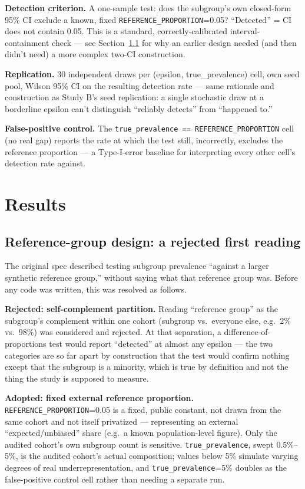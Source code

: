 \documentclass[11pt]{article}
\begin{document}
\textbf{Detection criterion.} A one-sample test: does the subgroup's own closed-form 95\% CI exclude a known, fixed \texttt{REFERENCE\_PROPORTION}=0.05? ``Detected'' = CI does not contain 0.05. This is a standard, correctly-calibrated interval-containment check --- see Section~\ref{sec:reference-design} for why an earlier design needed (and then didn't need) a more complex two-CI construction.

\textbf{Replication.} 30 independent draws per (epsilon, true\_prevalence) cell, own seed pool, Wilson 95\% CI on the resulting detection rate --- same rationale and construction as Study B's seed replication: a single stochastic draw at a borderline epsilon can't distinguish ``reliably detects'' from ``happened to.''

\textbf{False-positive control.} The \texttt{true\_prevalence == REFERENCE\_PROPORTION} cell (no real gap) reports the rate at which the test still, incorrectly, excludes the reference proportion --- a Type-I-error baseline for interpreting every other cell's detection rate against.

\section{Results}

\subsection{Reference-group design: a rejected first reading}
\label{sec:reference-design}

The original spec described testing subgroup prevalence ``against a larger synthetic reference group,'' without saying what that reference group was. Before any code was written, this was resolved as follows.

\textbf{Rejected: self-complement partition.} Reading ``reference group'' as the subgroup's complement within one cohort (subgroup vs.\ everyone else, e.g.\ 2\% vs.\ 98\%) was considered and rejected. At that separation, a difference-of-proportions test would report ``detected'' at almost any epsilon --- the two categories are so far apart by construction that the test would confirm nothing except that the subgroup is a minority, which is true by definition and not the thing the study is supposed to measure.

\textbf{Adopted: fixed external reference proportion.} \texttt{REFERENCE\_PROPORTION}=0.05 is a fixed, public constant, not drawn from the same cohort and not itself privatized --- representing an external ``expected/unbiased'' share (e.g.\ a known population-level figure). Only the audited cohort's own subgroup count is sensitive. \texttt{true\_prevalence}, swept 0.5\%--5\%, is the audited cohort's actual composition; values below 5\% simulate varying degrees of real underrepresentation, and \texttt{true\_prevalence}=5\% doubles as the false-positive control cell rather than needing a separate run.
\end{document}
